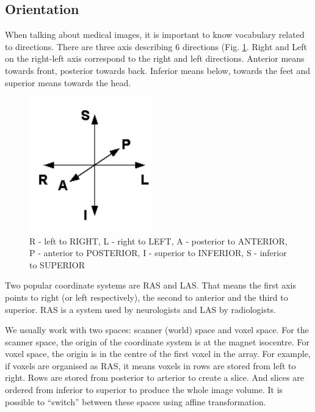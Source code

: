 \subsection{Orientation}
When talking about medical images, it is important to know vocabulary related to directions. There are three axis describing 6 directions (Fig. \ref{fig:orientations}. Right and Left on the right-left axis correspond to the right and left directions. Anterior means towards front, posterior towards back. Inferior means below, towards the feet and superior means towards the head.

\begin{figure}[ht!]
    \centering
    \includegraphics[width=150pt]{images/orientation.png}
    \caption[Orientations]{R - left to RIGHT, L - right to LEFT, A - posterior to ANTERIOR, P - anterior to POSTERIOR, I - superior to INFERIOR, S - inferior to SUPERIOR}
    \label{fig:orientations}
\end{figure}

Two popular coordinate systems are RAS and LAS. That means the first axis points to right (or left respectively), the second to anterior and the third to superior. RAS is a system used by neurologists and LAS by radiologists. 

We usually work with two spaces: scanner (world) space and voxel space. For the scanner space, the origin of the coordinate system is at the magnet isocentre. For voxel space, the origin is in the centre of the first voxel in the array. For example, if voxels are organised as RAS, it means voxels in rows are stored from left to right. Rows are stored from posterior to arterior to create a slice. And slices are ordered from inferior to superior to produce the whole image volume. It is possible to ``switch'' between these spaces using affine transformation. \cite{coordinate-systems}